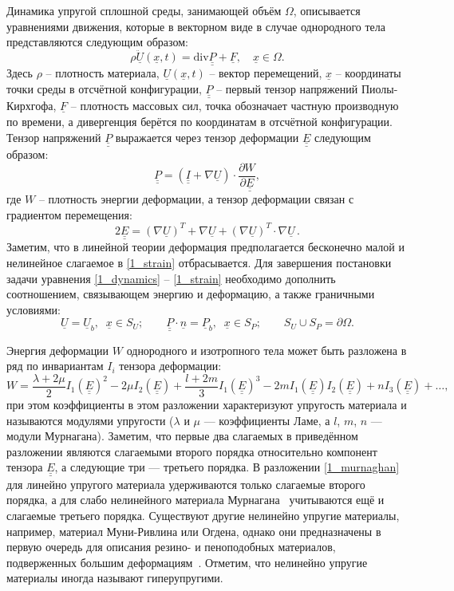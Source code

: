 \documentclass[12pt, a4paper]{report}
\newcommand{\vect}[1]{\underline{#1}}
\newcommand{\tens}[1]{\underline{\underline{#1}}}
\newcommand{\divg}{\text{div}}
\newcommand{\pdiff}[2]{\frac{\partial #1}{\partial #2}}
\begin{document}
Динамика упругой сплошной среды, занимающей объём $\Omega$, описывается уравнениями движения, которые в векторном виде в случае однородного тела представляются следующим образом:
\begin{equation}\label{1_dynamics}
\rho\ddot{\vect{U}}(\vect{x}, t) = \divg \tens{P} + \vect{F}, \quad \vect{x}\in\Omega.
\end{equation}
Здесь $\rho$ -- плотность материала, $\vect{U}(\vect{x},t)$ -- вектор перемещений, $\vect{x}$ -- координаты точки среды в отсчётной конфигурации, $\tens{P}$ -- первый тензор напряжений Пиолы-Кирхгофа, $\vect{F}$ -- плотность массовых сил, точка обозначает частную производную по времени, а дивергенция берётся по координатам в отсчётной конфигурации. Тензор напряжений $\tens{P}$ выражается через тензор деформации $\tens{E}$ следующим образом:
\begin{equation} \label{1_piola}
\tens{P} = (\tens{I} + \nabla\vect{U}) \cdot \pdiff{W}{\tens{E}},
\end{equation}
где $W$ -- плотность энергии деформации, а тензор деформации связан с градиентом перемещения:
\begin{equation}\label{1_strain}
2\tens{E} = (\nabla\vect{U})^T + \nabla\vect{U} + (\nabla\vect{U})^T\cdot\nabla\vect{U} \,.
\end{equation}
Заметим, что в линейной теории деформация предполагается бесконечно малой и нелинейное слагаемое в \eqref{1_strain} отбрасывается. Для завершения постановки задачи уравнения \eqref{1_dynamics} -- \eqref{1_strain} необходимо дополнить соотношением, связывающем энергию и деформацию, а также граничными условиями:
\begin{equation}\label{1_bc}
\vect{U} = \vect{U}_b, \;\; \vect{x}\in S_U; \qquad \tens{P}\cdot\vect{n} = \vect{P}_b, \;\; \vect{x}\in S_P; \qquad S_U\cup S_P = \partial\Omega.
\end{equation}

Энергия деформации $W$ однородного и изотропного тела может быть разложена в ряд по инвариантам $I_i$ тензора деформации:
\begin{equation}\label{1_murnaghan}
W = \frac{\lambda + 2\mu}{2}I_1(\tens{E})^2 - 2\mu I_2(\tens{E}) + \frac{l+2m}{3}I_1(\tens{E})^3 - 2m I_1(\tens{E}) I_2(\tens{E}) + n I_3(\tens{E}) + \dots,
\end{equation}
при этом коэффициенты в этом разложении характеризуют упругость материала и называются модулями упругости ($\lambda$ и $\mu$ --- коэффициенты Ламе, а $l$, $m$, $n$ --- модули Мурнагана). Заметим, что первые два слагаемых в приведённом разложении являются слагаемыми второго порядка относительно компонент тензора $\tens{E}$, а следующие три --- третьего порядка.
В разложении \eqref{1_murnaghan} для линейно упругого материала удерживаются только слагаемые второго порядка, а для слабо нелинейного материала Мурнагана~\cite{Murnaghan} учитываются ещё и слагаемые третьего порядка. Существуют другие нелинейно упругие материалы, например, материал Муни-Ривлина или Огдена, однако они предназначены в первую очередь для описания резино- и пеноподобных материалов, подверженных большим деформациям~\cite{Bergstrom}. Отметим, что нелинейно упругие материалы иногда называют гиперупругими.
\end{document}
